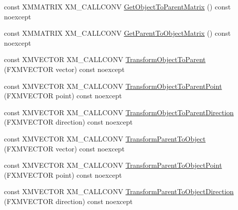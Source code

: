 \begin{DoxyCompactItemize}
\item 
const X\+M\+M\+A\+T\+R\+IX X\+M\+\_\+\+C\+A\+L\+L\+C\+O\+NV \mbox{\hyperlink{classmage_1_1_s1_e_t_transform3_d_ab34d4777f3faf3c72935c3a176253ba9}{Get\+Object\+To\+Parent\+Matrix}} () const noexcept
\item 
const X\+M\+M\+A\+T\+R\+IX X\+M\+\_\+\+C\+A\+L\+L\+C\+O\+NV \mbox{\hyperlink{classmage_1_1_s1_e_t_transform3_d_ac677d710b02f8477eaa2f2e053521032}{Get\+Parent\+To\+Object\+Matrix}} () const noexcept
\item 
const X\+M\+V\+E\+C\+T\+OR X\+M\+\_\+\+C\+A\+L\+L\+C\+O\+NV \mbox{\hyperlink{classmage_1_1_s1_e_t_transform3_d_a9142dea9f9290ff9c411790e574ec2d4}{Transform\+Object\+To\+Parent}} (F\+X\+M\+V\+E\+C\+T\+OR vector) const noexcept
\item 
const X\+M\+V\+E\+C\+T\+OR X\+M\+\_\+\+C\+A\+L\+L\+C\+O\+NV \mbox{\hyperlink{classmage_1_1_s1_e_t_transform3_d_a48b1888b21db8fd6822c1ff7fbe8a979}{Transform\+Object\+To\+Parent\+Point}} (F\+X\+M\+V\+E\+C\+T\+OR point) const noexcept
\item 
const X\+M\+V\+E\+C\+T\+OR X\+M\+\_\+\+C\+A\+L\+L\+C\+O\+NV \mbox{\hyperlink{classmage_1_1_s1_e_t_transform3_d_aa2bd50580ec3aa4849d1005ea9f36420}{Transform\+Object\+To\+Parent\+Direction}} (F\+X\+M\+V\+E\+C\+T\+OR direction) const noexcept
\item 
const X\+M\+V\+E\+C\+T\+OR X\+M\+\_\+\+C\+A\+L\+L\+C\+O\+NV \mbox{\hyperlink{classmage_1_1_s1_e_t_transform3_d_aff4a883d1fcab67e5ff5373863f935dc}{Transform\+Parent\+To\+Object}} (F\+X\+M\+V\+E\+C\+T\+OR vector) const noexcept
\item 
const X\+M\+V\+E\+C\+T\+OR X\+M\+\_\+\+C\+A\+L\+L\+C\+O\+NV \mbox{\hyperlink{classmage_1_1_s1_e_t_transform3_d_aa90c045e5fc78b2ba2f3ec9873c9f14c}{Transform\+Parent\+To\+Object\+Point}} (F\+X\+M\+V\+E\+C\+T\+OR point) const noexcept
\item 
const X\+M\+V\+E\+C\+T\+OR X\+M\+\_\+\+C\+A\+L\+L\+C\+O\+NV \mbox{\hyperlink{classmage_1_1_s1_e_t_transform3_d_a11f8c6eedc98d3b948fb32c0c9113062}{Transform\+Parent\+To\+Object\+Direction}} (F\+X\+M\+V\+E\+C\+T\+OR direction) const noexcept
\end{DoxyCompactItemize}

